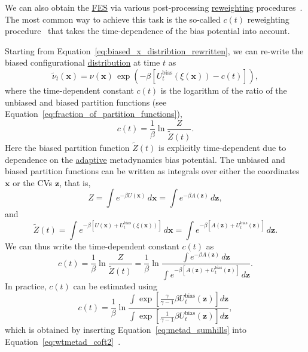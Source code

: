 \documentclass[9pt,review]{livecoms}
\newcommand{\vx}{\mathbf{x}}
\newcommand{\vz}{\mathbf{z}}
\begin{document}
We can also obtain the \hyperlink{ref:FES} {FES} via various post-processing \hyperlink{ref:Reweighting} {reweighting} procedures~\cite{bonomi_rewt,tiwary_rewt,Branduardi-JCTC-2012,Schafer_RewMetaD_2020,Giberti_IterRew_JCTC2019,10.1063/1.5123498,10.1016/j.cplett.2020.137384}. The most common way to achieve this task is the so-called $c(t)$ reweighting procedure~\cite{bonomi_rewt,tiwary_rewt} that takes the time-dependence of the bias potential into account.

Starting from Equation~\ref{eq:biased_x_distribtion_rewritten}, we can re-write the biased configurational \hyperlink{ref:Distribution} {distribution} at time $t$ as
\begin{equation}
\label{eq:biased_prob_dist_with_c_of_t}
\tilde{\nu}_{t}(\vx) = \nu(\vx) \, \exp
\left(-\beta\left[
U_{t}^{\mathrm{bias}}(\xi(\vx))-c(t)
\right] \right),
\end{equation}
where the time-dependent constant $c(t)$ is the logarithm of the ratio of the unbiased and biased partition functions (see Equation~\ref{eq:fraction_of_partition_functions}),
\begin{equation}
c(t) =
\frac{1}{\beta} \ln \frac{Z}{\tilde{Z}(t)}.
\end{equation}
Here the biased partition function $\tilde{Z}(t)$ is explicitly time-dependent due to dependence on the \hyperlink{ref:Adaptive} {adaptive} metadynamics bias potential.
The unbiased and biased partition functions can be written as integrals over either the coordinates $\vx$ or the CVs $\vz$, that is,
\begin{equation}
Z = \int e^{-\beta U(\vx) } \, d\vx = \int e^{-\beta A(\vz) } \, d\vz,
\end{equation}
and
\begin{equation}
\tilde{Z}(t) = \int e^{-\beta\left [ U(\vx) + U_{t}^\mathrm{bias}(\xi(\vx)) \right]} \, d\vx = \int e^{-\beta\left [ A(\vz) + U_{t}^\mathrm{bias}(\vz) \right]} \, d\vz.
\end{equation}
We can thus write the time-dependent constant $c(t)$ as \begin{equation}
\label{eq:wtmetad_coft2}
c(t) =
\frac{1}{\beta} \ln \frac{Z}{\tilde{Z}(t)} =
\frac{1}{\beta} \ln \frac
{\int e^{-\beta A(\vz)} \,  d\vz }
{\int e^{-\beta \left[ A(\vz) + U_{t}^{\mathrm{bias}}(\vz) \right]} \, d\vz }.
\end{equation}
In practice, $c(t)$ can be estimated using
\begin{equation}
\label{eq:wtmetad_coft_estimate}
c(t) = \frac{1}{\beta} \ln
\frac
{\int \exp \left[ \frac{\gamma}{\gamma-1} \beta U_{t}^{\mathrm{bias}}(\vz)  \right] d\vz }
{\int \exp \left[ \frac{1}{\gamma-1} \beta U_{t}^{\mathrm{bias}}(\vz)  \right] d\vz },
\end{equation}
which is obtained by inserting Equation~\ref{eq:metad_sumhills} into Equation~\ref{eq:wtmetad_coft2}~\cite{tiwary_rewt,Valsson2016_ARPC_MetaD}.
\end{document}
